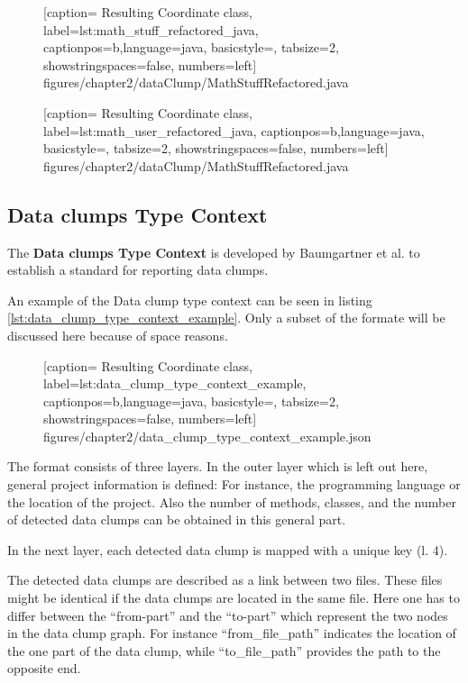   \begin{figure} [htbp!]
			
			[caption={ Resulting Coordinate class},
			label={lst:math_stuff_refactored_java},
			captionpos=b,language=java, basicstyle=\footnotesize, tabsize=2, showstringspaces=false,  numbers=left]
			{figures/chapter2/dataClump/MathStuffRefactored.java}
		\end{figure}
  \begin{figure} [htbp!]
			
			[caption={ Resulting Coordinate class},
			label={lst:math_user_refactored_java},
			captionpos=b,language=java, basicstyle=\footnotesize, tabsize=2, showstringspaces=false,  numbers=left]
			{figures/chapter2/dataClump/MathStuffRefactored.java}
		\end{figure}

\subsection{ Data clumps Type Context }\label{sec:data_clump_format}

The \textbf{Data clumps Type Context} \cite{dataclump_type_context} is developed by Baumgartner et al. to establish a standard for reporting data clumps.

An example of the Data clump type context can be seen in listing \ref{lst:data_clump_type_context_example}. Only a subset of the formate will be discussed here because of space reasons.

  \begin{figure} [htbp!]
			
			[caption={ Resulting Coordinate class},
			label={lst:data_clump_type_context_example},
			captionpos=b,language=java, basicstyle=\footnotesize, tabsize=2, showstringspaces=false,  numbers=left]
			{figures/chapter2/data_clump_type_context_example.json}
		\end{figure}

The format consists of three layers. In the outer layer which is left out here, general project information is defined: For instance, the programming language or the location of the project. Also the number of methods, classes, and the number of detected data clumps can be obtained in this general part. 

In the next layer, each detected data clump is mapped with a unique key (l. 4).

The detected data clumps are described as a link between two files. These files might be identical if the data clumps are located in the same file. Here one has to differ between the \enquote{from-part} and the \enquote{to-part} which represent the two nodes in the data clump graph. For instance \enquote{from\_file\_path} indicates the location of the one part of the data clump, while \enquote{to\_file\_path} provides the path to the opposite end. 

